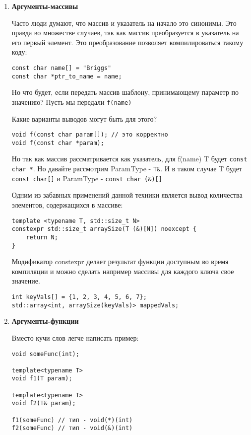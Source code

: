 \begin{enumerate}
				\item \textbf{Аргументы-массивы}
				
				Часто люди думают, что массив и указатель на начало это синонимы. Это правда во множестве случаев, так как массив преобразуется в указатель на его первый элемент. Это преобразование позволяет компилироваться такому коду:
				
\begin{verbatim}
const char name[] = "Briggs"
const char *ptr_to_name = name;
\end{verbatim}
				
				Но что будет, если передать массив шаблону, принимающему параметр по значению?
				Пусть мы передали \texttt{f(name)}
				
				Какие варианты выводов могут быть для этого?
				
\begin{verbatim}
void f(const char param[]); // это корректно
void f(const char *param);
\end{verbatim}
				
				Но так как массив рассматривается как указатель, для f(name) T будет \texttt{const char *}.
				Но давайте рассмотрим ParamType - \texttt{T&}. И в таком случае T будет \texttt{const char[]} и ParamType -  \texttt{const char (&)[]}
				
				Одним из забавных применений данной техники является вывод количества элементов, содержащихся в массиве:
				
\begin{verbatim}
template <typename T, std::size_t N>
constexpr std::size_t arraySize(T (&)[N]) noexcept {
	return N;
}
\end{verbatim}
				Модификатор constexpr делает результат функции доступным во время компиляции и можно сделать например массивы для каждого ключа свое значение.
\begin{verbatim}
int keyVals[] = {1, 2, 3, 4, 5, 6, 7};
std::array<int, arraySize(keyVals)> mappedVals;
\end{verbatim}
				
				\item \textbf{Аргументы-функции}
				
				Вместо кучи слов легче написать пример:
\begin{verbatim}
void someFunc(int);

template<typename T>
void f1(T param);

template<typename T>
void f2(T& param);

f1(someFunc) // тип - void(*)(int)
f2(someFunc) // тип - void(&)(int)
\end{verbatim}
\end{enumerate}
	
